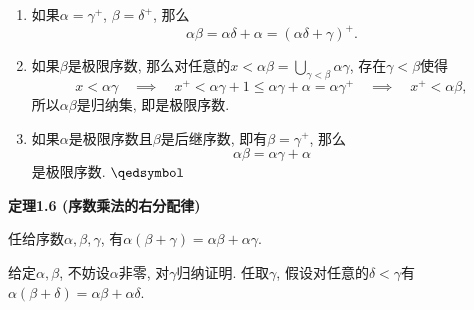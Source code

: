 \documentclass[UTF8]{ctexart}
\begin{document}
\begin{enumerate}
    \item 如果$\alpha=\gamma^+$, $\beta=\delta^+$, 那么
    \[
        \alpha\beta=\alpha\delta+\alpha=(\alpha\delta+\gamma)^+.
    \]
    \item 如果$\beta$是极限序数, 那么对任意的$\displaystyle
    x<\alpha\beta=\bigcup_{\gamma<\beta}\alpha\gamma$, 存在$\gamma<\beta$使得
    \vspace{3pt}
    \[
        x<\alpha\gamma\quad\implies\quad
        x^+<\alpha\gamma+1\leqslant\alpha\gamma+\alpha=\alpha\gamma^+
        \quad\implies\quad x^+<\alpha\beta,
    \]
    所以$\alpha\beta$是归纳集, 即是极限序数.
    \item 如果$\alpha$是极限序数且$\beta$是后继序数, 即有$\beta=\gamma^+$, 那么
    \[
        \alpha\beta=\alpha\gamma+\alpha
    \]
    是极限序数. \hfill $\qedsymbol$
\end{enumerate}





\newpage

\hypertarget{sec:定理1.6}{}
\noindent\textbf{定理1.6 (序数乘法的右分配律)}

任给序数$\alpha,\beta,\gamma$, 有$\alpha(\beta+\gamma)=\alpha\beta+\alpha\gamma$.


给定$\alpha,\beta$, 不妨设$\alpha$非零, 对$\gamma$归纳证明.
任取$\gamma$, 假设对任意的$\delta<\gamma$有
$\alpha(\beta+\delta)=\alpha\beta+\alpha\delta$.
\end{document}
